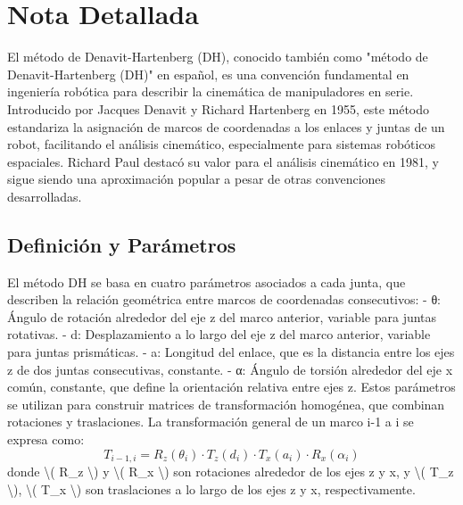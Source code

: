 \documentclass{article}%
\begin{document}
%
\hrulefill%
\section{Nota Detallada}%
\label{sec:NotaDetallada}%
El método de Denavit{-}Hartenberg (DH), conocido también como "método de Denavit{-}Hartenberg (DH)" en español, es una convención fundamental en ingeniería robótica para describir la cinemática de manipuladores en serie. Introducido por Jacques Denavit y Richard Hartenberg en 1955, este método estandariza la asignación de marcos de coordenadas a los enlaces y juntas de un robot, facilitando el análisis cinemático, especialmente para sistemas robóticos espaciales. Richard Paul destacó su valor para el análisis cinemático en 1981, y sigue siendo una aproximación popular a pesar de otras convenciones desarrolladas.\newline%
%
\subsection{Definición y Parámetros}%
\label{subsec:DefinicinyParmetros}%
El método DH se basa en cuatro parámetros asociados a cada junta, que describen la relación geométrica entre marcos de coordenadas consecutivos:\newline%
%
{-} θ: Ángulo de rotación alrededor del eje z del marco anterior, variable para juntas rotativas.\newline%
%
{-} d: Desplazamiento a lo largo del eje z del marco anterior, variable para juntas prismáticas.\newline%
%
{-} a: Longitud del enlace, que es la distancia entre los ejes z de dos juntas consecutivas, constante.\newline%
%
{-} α: Ángulo de torsión alrededor del eje x común, constante, que define la orientación relativa entre ejes z.\newline%
%
Estos parámetros se utilizan para construir matrices de transformación homogénea, que combinan rotaciones y traslaciones. La transformación general de un marco i{-}1 a i se expresa como:\newline%
%
\[%
T_{i-1,i} = R_z(\theta_i) \cdot T_z(d_i) \cdot T_x(a_i) \cdot R_x(\alpha_i)%
\]%
donde \textbackslash{}( R\_z \textbackslash{}) y \textbackslash{}( R\_x \textbackslash{}) son rotaciones alrededor de los ejes z y x, y \textbackslash{}( T\_z \textbackslash{}), \textbackslash{}( T\_x \textbackslash{}) son traslaciones a lo largo de los ejes z y x, respectivamente.\newline%
\end{document}
